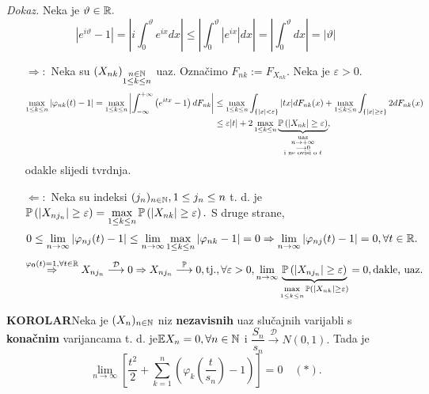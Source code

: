 \documentclass{article}
\begin{document}
\textit{Dokaz.}\newline
Neka je \(\vartheta\in\Bbb R.\) \[\left|e^{i\vartheta}-1\right|=\left|i\int_0^\vartheta e^{ix}dx\right|\le\left|\int_0^\vartheta\left|e^{ix}\right|dx\right|=\left|\int_0^\vartheta dx\right|=|\vartheta|\]
\begin{itemize}
    \item[\(\boxed{\Rightarrow}:\)] Neka su \((X_{nk})_{\substack{n\in\Bbb N\\1\le k\le n}}\) uaz. Označimo \(F_{nk}:=F_{X_{nk}}.\) Neka je \(\varepsilon>0.\) \[\begin{aligned}\max_{1\le k\le n}\left|\varphi_{nk}(t)-1\right|=\max_{1\le k\le n}\left|\int_{-\infty}^{+\infty}\left(e^{itx}-1\right)dF_{nk}\right|&\le\max_{1\le k\le n}\int_{\left\{|x|<\varepsilon\right\}}|tx|dF_{nk}(x)+\max_{1\le k\le n}\int_{\{|x|\ge\varepsilon\}}2dF_{nk}(x)\\&\le\varepsilon|t|+2\max_{1\le k\le n}\underbrace{\Bbb P\left(|X_{nk}|\ge\varepsilon\right)}_{\substack{\overset{\substack{\text{uaz}\\n\to+\infty}}{\longrightarrow 0}\\\text{i ne ovisi o }t}},\end{aligned}\] odakle slijedi tvrdnja.
    \item[\(\boxed{\Leftarrow}:\)] Neka su indeksi \((j_n)_{n\in\Bbb N},1\le j_n\le n\) t. d. je \(\displaystyle\Bbb P\left(|X_{nj_n}|\ge\varepsilon\right)=\max_{1\le k\le n}\Bbb P\left(|X_{nk}|\ge\varepsilon\right).\) S druge strane, \[0\le\lim_{n\to\infty}|\varphi_{nj}(t)-1|\le\lim_{n\to\infty}\max_{1\le k\le n}|\varphi_{nk}-1|=0\Rightarrow\lim_{n\to\infty}|\varphi_{nj}(t)-1|=0,\forall t\in\Bbb R.\] \[\overset{\varphi_{\mathbf 0}(t)=1,\forall t\in\Bbb R}{\Rightarrow}X_{nj_n}\overset{\mathcal D}{\longrightarrow}0\Rightarrow X_{nj_n}\overset{\Bbb P}{\longrightarrow}0,\text{tj.},\forall\varepsilon>0,\lim_{n\to\infty}\underbrace{\Bbb P\left(|X_{nj_n}|\ge\varepsilon\right)}_{\max\limits_{1\le k\le n}\Bbb P\left(|X_{nk}|\ge\varepsilon\right)}=0,\text{dakle, uaz.}\]   
\end{itemize}
\textbf{KOROLAR}\newline Neka je \((X_n)_{n\in\Bbb N}\) niz \textbf{nezavisnih} uaz slučajnih varijabli s \textbf{konačnim} varijancama t. d. je\newline \(\Bbb EX_n=0,\forall n\in\Bbb N\) i \(\dfrac{S_n}{s_n}\overset{\mathcal D}{\longrightarrow}N(0,1).\) Tada je \[\lim_{n\to\infty}\left[\frac{t^2}2+\sum_{k=1}^n \left(\varphi_k\left(\frac{t}{s_n}\right)-1\right)\right]=0\quad (*).\]
\end{document}
